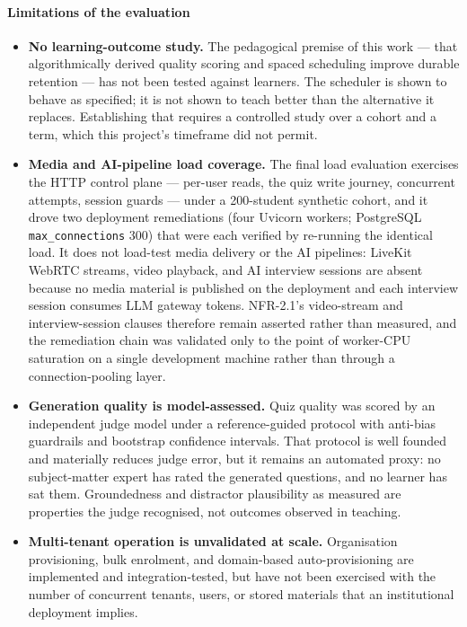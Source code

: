 \paragraph{Limitations of the evaluation}
\begin{itemize}
    \item \textbf{No learning-outcome study.} The pedagogical premise of this work --- that algorithmically derived quality scoring and spaced scheduling improve durable retention --- has not been tested against learners. The scheduler is shown to behave as specified; it is not shown to teach better than the alternative it replaces. Establishing that requires a controlled study over a cohort and a term, which this project's timeframe did not permit.

    \item \textbf{Media and AI-pipeline load coverage.} The final load evaluation exercises the HTTP control plane --- per-user reads, the quiz write journey, concurrent attempts, session guards --- under a 200-student synthetic cohort, and it drove two deployment remediations (four Uvicorn workers; PostgreSQL \texttt{max\_connections} 300) that were each verified by re-running the identical load. It does not load-test media delivery or the AI pipelines: LiveKit WebRTC streams, video playback, and AI interview sessions are absent because no media material is published on the deployment and each interview session consumes LLM gateway tokens. NFR-2.1's video-stream and interview-session clauses therefore remain asserted rather than measured, and the remediation chain was validated only to the point of worker-CPU saturation on a single development machine rather than through a connection-pooling layer.

    \item \textbf{Generation quality is model-assessed.} Quiz quality was scored by an independent judge model under a reference-guided protocol with anti-bias guardrails and bootstrap confidence intervals. That protocol is well founded and materially reduces judge error, but it remains an automated proxy: no subject-matter expert has rated the generated questions, and no learner has sat them. Groundedness and distractor plausibility as measured are properties the judge recognised, not outcomes observed in teaching.

    \item \textbf{Multi-tenant operation is unvalidated at scale.} Organisation provisioning, bulk enrolment, and domain-based auto-provisioning are implemented and integration-tested, but have not been exercised with the number of concurrent tenants, users, or stored materials that an institutional deployment implies.
\end{itemize}


